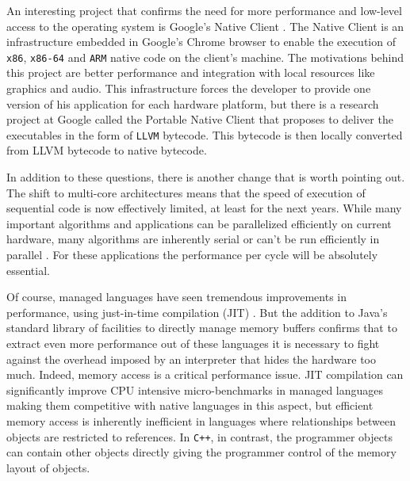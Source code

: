 An interesting project that confirms the need for more performance and low-level access to the operating system is Google's Native Client \cite{NaCl}.
The Native Client is an infrastructure embedded in Google's Chrome browser to enable the execution of \texttt{x86}, \texttt{x86-64} and \texttt{ARM}
native code on the client's machine. The motivations behind this project are better performance and integration with local resources like graphics and audio. This infrastructure
forces the developer to provide one version of his application for each hardware platform, but there is a research project at Google called the Portable
Native Client \cite{pNaCl} that proposes to deliver the executables in the form of \texttt{LLVM} bytecode. This bytecode is then locally converted from LLVM bytecode to native bytecode.

In addition to these questions, there is another change that is worth pointing out. The shift to multi-core architectures means that the speed of
execution of sequential code is now effectively limited, at least for the next years. While many important algorithms and applications can be
parallelized efficiently on current hardware, many algorithms are inherently serial or can't be run efficiently in parallel \cite{Madriles}.
For these applications the performance per cycle will be absolutely essential.

Of course, managed languages have seen tremendous improvements in performance, using just-in-time compilation (JIT) \cite{Aycock}. But the
addition to Java's standard library of facilities to directly manage memory buffers confirms that to extract even more performance out of
these languages it is necessary to fight against the overhead imposed by an interpreter that hides the hardware too much.
Indeed, memory access is a critical performance issue. JIT compilation can significantly improve CPU intensive micro-benchmarks
in managed languages making them competitive with native languages in this aspect, but efficient memory access is inherently
inefficient in languages where relationships between objects are restricted to references. In \texttt{C++}, in contrast,
the programmer objects can contain other objects directly giving the programmer control of the memory layout of objects.

